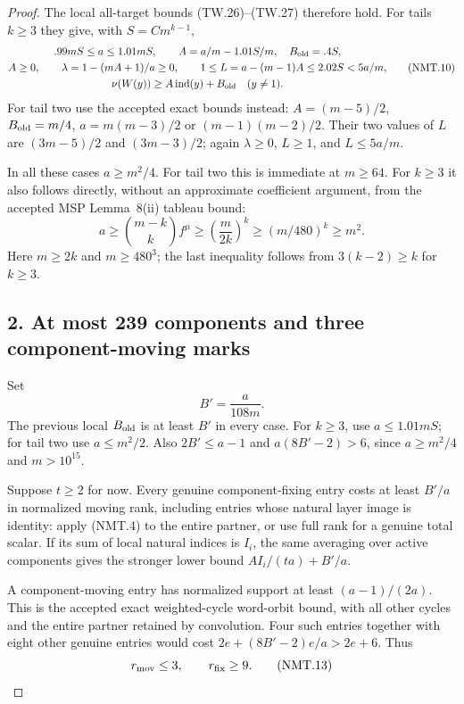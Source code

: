 \begin{proof}
The local all-target bounds (TW.26)--(TW.27) therefore hold.
For tails $k\ge3$ they give, with $S=Cm^{k-1}$,
\[
 \begin{gathered}
 .99mS\le a\le1.01mS,\qquad
 A=a/m-1.01S/m,\quad B_{\rm old}=.4S,\\
 A\ge0,\qquad
 \lambda=1-(mA+1)/a\ge0,\qquad
 1\le L=a-(m-1)A\le2.02S<5a/m,\\
 \nu(W(y))\ge A\operatorname{ind}(y)+B_{\rm old}
                       \quad(y\ne1).
 \end{gathered}
 \tag{NMT.10}
\]
For tail two use the accepted exact bounds instead:
$A=(m-5)/2$, $B_{\rm old}=m/4$,
$a=m(m-3)/2$ or $(m-1)(m-2)/2$.
Their two values of $L$ are $(3m-5)/2$ and $(3m-3)/2$;
again $\lambda\ge0$, $L\ge1$, and $L\le5a/m$.

In all these cases $a\ge m^2/4$.
For tail two this is immediate at $m\ge64$.
For $k\ge3$ it also follows directly, without an approximate
coefficient argument, from the accepted MSP Lemma~8(ii) tableau
bound:
\[
 a\ge\binom{m-k}{k}f^\mu
   \ge\left(\frac{m}{2k}\right)^k
   \ge(m/480)^k\ge m^2.
 \tag{NMT.11}
\]
Here $m\ge2k$ and $m\ge480^3$; the last inequality follows from
$3(k-2)\ge k$ for $k\ge3$.

\subsection*{2. At most 239 components and three component-moving marks}

Set
\[
                         B'=\frac{a}{108m}.
 \tag{NMT.12}
\]
The previous local $B_{\rm old}$ is at least $B'$ in every case.
For $k\ge3$, use $a\le1.01mS$; for tail two use $a\le m^2/2$.
Also $2B'\le a-1$ and $a(8B'-2)>6$, since $a\ge m^2/4$
and $m>10^{15}$.

Suppose $t\ge2$ for now.
Every genuine component-fixing entry costs at least $B'/a$ in
normalized moving rank, including entries whose natural layer
image is identity: apply (NMT.4) to the entire partner, or use
full rank for a genuine total scalar.  If its sum of local
natural indices is $I_i$, the same averaging over active
components gives the stronger lower bound
$AI_i/(ta)+B'/a$.

A component-moving entry has normalized support at least
$(a-1)/(2a)$.  This is the accepted exact weighted-cycle
word-orbit bound, with all other cycles and the entire partner
retained by convolution.  Four such entries together with
eight other genuine entries would cost
$2e+(8B'-2)e/a>2e+6$.  Thus
\[
               r_{\rm mov}\le3,\qquad r_{\rm fix}\ge9.
 \tag{NMT.13}
\]


\end{proof}
